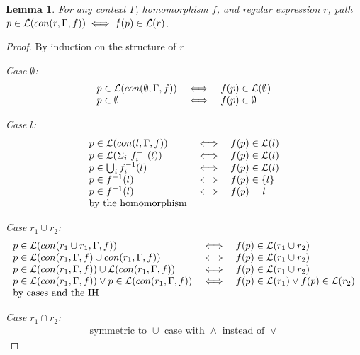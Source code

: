 \documentclass[twocolumn, openany]{sig-alternate-10pt}
\newtheorem{lem}[thm]{Lemma}
\begin{document}
\vspace{1em}
\begin{lem}
  For any context $\Gamma$, homomorphism $f$, and regular expression $r$, 
  path $p \in \mathcal{L}(con(r,\Gamma,f)) \iff f(p) \in \mathcal{L}(r)$.
\end{lem}
\begin{proof}
By induction on the structure of $r$

\emph{Case $\emptyset$:}
  \[ \begin{array}{lll}
    p \in \mathcal{L}(con(\emptyset,\Gamma,f)) &\iff& f(p) \in \mathcal{L}(\emptyset) \\
    p \in \emptyset &\iff& f(p) \in \emptyset \\
  \end{array} \]

\emph{Case $l$:}
  \[ \begin{array}{lll}
    p \in \mathcal{L}(con(l,\Gamma,f)) &\iff& f(p) \in \mathcal{L}(l) \\
    p \in \mathcal{L}(\Sigma_i ~ f_i^{-1}(l)) &\iff& f(p) \in \mathcal{L}(l) \\
    p \in \bigcup_i f_i^{-1}(l) &\iff& f(p) \in \mathcal{L}(l) \\
    p \in f^{-1}(l) &\iff& f(p) \in \{ l \} \\
    p \in f^{-1}(l) &\iff& f(p) = l \\
    \text{by the homomorphism} & & \\
  \end{array} \]

\emph{Case $r_1 \cup r_2$:}
  \[ \begin{array}{lll}
    p \in \mathcal{L}(con(r_1 \cup r_1,\Gamma,f)) &\iff& f(p) \in \mathcal{L}(r_1 \cup r_2) \\
    p \in \mathcal{L}(con(r_1,\Gamma,f) \cup con(r_1,\Gamma,f)) &\iff& f(p) \in \mathcal{L}(r_1 \cup r_2) \\
    p \in \mathcal{L}(con(r_1,\Gamma,f)) \cup \mathcal{L}(con(r_1,\Gamma,f)) &\iff& f(p) \in \mathcal{L}(r_1 \cup r_2) \\
    p \in \mathcal{L}(con(r_1,\Gamma,f)) \vee p \in \mathcal{L}(con(r_1,\Gamma,f)) 
       &\iff& 
       f(p) \in \mathcal{L}(r_1) \vee f(p) \in \mathcal{L}(r_2) \\
    \text{by cases and the IH} & & \\
  \end{array} \]

\emph{Case $r_1 \cap r_2$:} 
  \[ \begin{array}{c}
    \text{symmetric to } \cup \text{ case with } \wedge \text{ instead of } \vee
  \end{array} \]


\end{proof}
\end{document}
